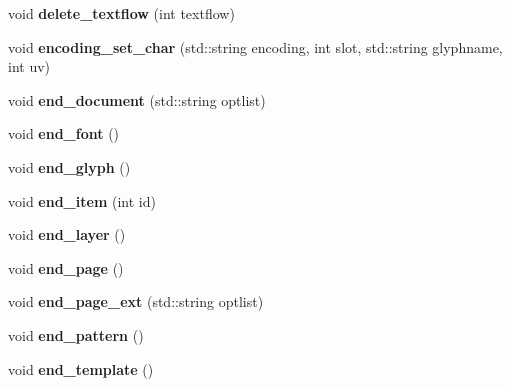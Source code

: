\begin{DoxyCompactItemize}
\item 
\hypertarget{classPDFlib_ac4562f4944113165c37d27c3f2481412}{void {\bfseries delete\-\_\-textflow} (int textflow)}\label{classPDFlib_ac4562f4944113165c37d27c3f2481412}

\item 
\hypertarget{classPDFlib_a83ebfdf9ada3df0634b6748aa2d27eff}{void {\bfseries encoding\-\_\-set\-\_\-char} (std\-::string encoding, int slot, std\-::string glyphname, int uv)}\label{classPDFlib_a83ebfdf9ada3df0634b6748aa2d27eff}

\item 
\hypertarget{classPDFlib_aadbf95532d240e683aeda234624c7f61}{void {\bfseries end\-\_\-document} (std\-::string optlist)}\label{classPDFlib_aadbf95532d240e683aeda234624c7f61}

\item 
\hypertarget{classPDFlib_ad38e3338e0217a90ff322083b7d66843}{void {\bfseries end\-\_\-font} ()}\label{classPDFlib_ad38e3338e0217a90ff322083b7d66843}

\item 
\hypertarget{classPDFlib_a75da9905bdccda79115aa724a7aff2bd}{void {\bfseries end\-\_\-glyph} ()}\label{classPDFlib_a75da9905bdccda79115aa724a7aff2bd}

\item 
\hypertarget{classPDFlib_a1052c7d1cb2993e32341718e9c36c30c}{void {\bfseries end\-\_\-item} (int id)}\label{classPDFlib_a1052c7d1cb2993e32341718e9c36c30c}

\item 
\hypertarget{classPDFlib_a485ab7dd0996da8194e768e1c97eed21}{void {\bfseries end\-\_\-layer} ()}\label{classPDFlib_a485ab7dd0996da8194e768e1c97eed21}

\item 
\hypertarget{classPDFlib_ad155354f3b07ccf69bc82000211a4018}{void {\bfseries end\-\_\-page} ()}\label{classPDFlib_ad155354f3b07ccf69bc82000211a4018}

\item 
\hypertarget{classPDFlib_aaeb1219f151a8b54e2c02e4e4633856b}{void {\bfseries end\-\_\-page\-\_\-ext} (std\-::string optlist)}\label{classPDFlib_aaeb1219f151a8b54e2c02e4e4633856b}

\item 
\hypertarget{classPDFlib_ac7a93102d044e6c8bd06d2a83c6b66f7}{void {\bfseries end\-\_\-pattern} ()}\label{classPDFlib_ac7a93102d044e6c8bd06d2a83c6b66f7}

\item 
\hypertarget{classPDFlib_a67057f952266b4cbdd737b61a85090f7}{void {\bfseries end\-\_\-template} ()}\label{classPDFlib_a67057f952266b4cbdd737b61a85090f7}


\end{DoxyCompactItemize}

